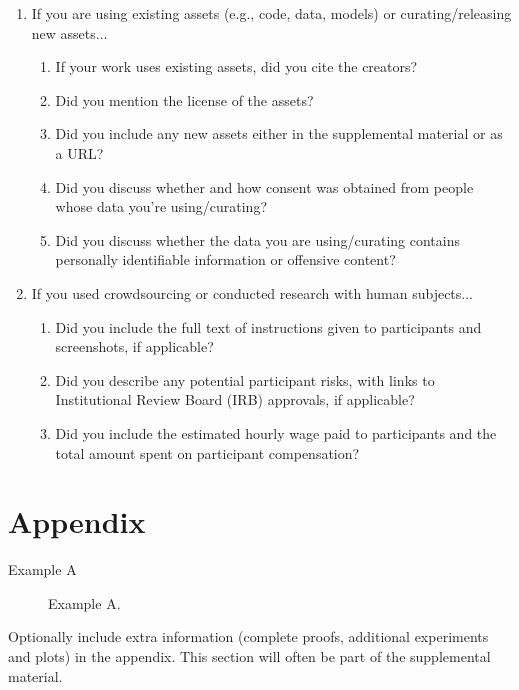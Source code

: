 \documentclass{article}
\begin{document}
\begin{enumerate}
\item If you are using existing assets (e.g., code, data, models) or curating/releasing new assets...
\begin{enumerate}
  \item If your work uses existing assets, did you cite the creators?
    \answerNA{}
  \item Did you mention the license of the assets?
    \answerNA{}
  \item Did you include any new assets either in the supplemental material or as a URL?
    \answerNA{}
  \item Did you discuss whether and how consent was obtained from people whose data you're using/curating?
    \answerNA{}
  \item Did you discuss whether the data you are using/curating contains personally identifiable information or offensive content?
    \answerNA{}
\end{enumerate}


\item If you used crowdsourcing or conducted research with human subjects...
\begin{enumerate}
  \item Did you include the full text of instructions given to participants and screenshots, if applicable?
    \answerNA{}
  \item Did you describe any potential participant risks, with links to Institutional Review Board (IRB) approvals, if applicable?
    \answerNA{}
  \item Did you include the estimated hourly wage paid to participants and the total amount spent on participant compensation?
    \answerNA{}
\end{enumerate}


\end{enumerate}





\appendix


\section{Appendix}

Example A

\begin{figure}
  \centering
  \fbox{\rule[-.5cm]{0cm}{4cm} \rule[-.5cm]{4cm}{0cm}}
  \caption{Example A.}
\end{figure}

Optionally include extra information (complete proofs, additional experiments and plots) in the appendix.
This section will often be part of the supplemental material.
\end{document}
